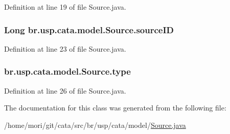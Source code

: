 Definition at line 19 of file Source.\+java.

\hypertarget{classbr_1_1usp_1_1cata_1_1model_1_1_source_a5431dc69303c48300f1933087060eca9}{
\subsubsection[{source\+I\+D}]{\setlength{\rightskip}{0pt plus 5cm}Long br.\+usp.\+cata.\+model.\+Source.\+source\+I\+D\hspace{0.3cm}{\ttfamily [private]}}}\label{classbr_1_1usp_1_1cata_1_1model_1_1_source_a5431dc69303c48300f1933087060eca9}


Definition at line 23 of file Source.\+java.

\hypertarget{classbr_1_1usp_1_1cata_1_1model_1_1_source_af6db8bd36070fd657b6239601089283b}{
\subsubsection[{type}]{ br.\+usp.\+cata.\+model.\+Source.\+type\hspace{0.3cm}{\ttfamily [private]}}}\label{classbr_1_1usp_1_1cata_1_1model_1_1_source_af6db8bd36070fd657b6239601089283b}


Definition at line 26 of file Source.\+java.



The documentation for this class was generated from the following file\+:\begin{DoxyCompactItemize}
\item 
/home/mori/git/cata/src/br/usp/cata/model/\hyperlink{_source_8java}{Source.\+java}\end{DoxyCompactItemize}
